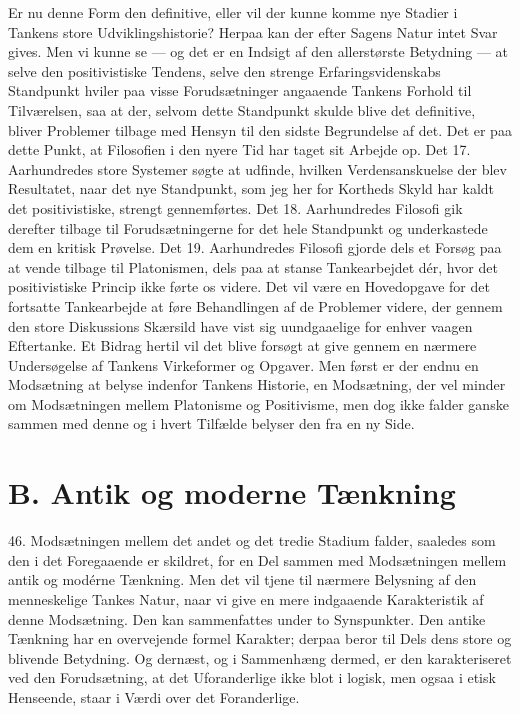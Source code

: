 \documentclass[12pt,a4paper]{book}
\newcommand{\apage}[1]{\marginnote{\footnotesize\textit{[#1]}}}
\begin{document}
\apage{123} Er nu denne Form den definitive, eller vil der kunne komme nye Stadier i
Tankens store Udviklingshistorie? Herpaa kan der efter Sagens Natur
intet Svar gives. Men vi kunne se --- og det er en Indsigt af den
allerstørste Betydning --- at selve den positivistiske Tendens, selve
den strenge Erfaringsvidenskabs Standpunkt hviler paa visse
Forudsætninger angaaende Tankens Forhold til Tilværelsen, saa at der,
selvom dette Standpunkt skulde blive det definitive, bliver Problemer
tilbage med Hensyn til den sidste Begrundelse af det. Det er paa dette
Punkt, at Filosofien i den nyere Tid har taget sit Arbejde op. Det 17.
Aarhundredes store Systemer søgte at udfinde, hvilken Verdensanskuelse
der blev Resultatet, naar det nye Standpunkt, som jeg her for Kortheds
Skyld har kaldt det positivistiske, strengt gennemførtes. Det 18.
Aarhundredes Filosofi gik derefter tilbage til Forudsætningerne for det
hele Standpunkt og underkastede dem en kritisk Prøvelse. Det 19.
Aarhundredes Filosofi gjorde dels et Forsøg paa at vende tilbage til
Platonismen, dels paa at stanse Tankearbejdet dér, hvor det
positivistiske Princip ikke førte os videre. Det vil være en
Hovedopgave for det fortsatte Tankearbejde at føre Behandlingen af de
Problemer videre, der gennem den store Diskussions Skærsild have vist sig
uundgaaelige for enhver vaagen Eftertanke. Et Bidrag hertil vil det
blive forsøgt at give gennem en nærmere Undersøgelse af Tankens
Virkeformer og Opgaver. Men først er der endnu en Modsætning at belyse
indenfor Tankens Historie, en Modsætning, der vel minder om Modsætningen
mellem Platonisme og Positivisme, men dog ikke falder ganske sammen med
denne og i hvert Tilfælde belyser den fra en ny Side.

\section*{B. Antik og moderne Tænkning}
\label{sec:antik-moderne}

46. Modsætningen mellem det andet og det tredie Stadium falder, saaledes
som den i det Foregaaende er skildret, for en Del sammen med
Modsætningen mellem antik og modérne \apage{124} Tænkning. Men det vil tjene til
nærmere Belysning af den menneskelige Tankes Natur, naar vi give en mere
indgaaende Karakteristik af denne Modsætning. Den kan sammenfattes under
to Synspunkter. Den antike Tænkning har en overvejende formel Karakter;
derpaa beror til Dels dens store og blivende Betydning. Og dernæst, og i
Sammenhæng dermed, er den karakteriseret ved den Forudsætning, at det
Uforanderlige ikke blot i logisk, men ogsaa i etisk Henseende, staar i
Værdi over det Foranderlige.
\end{document}
